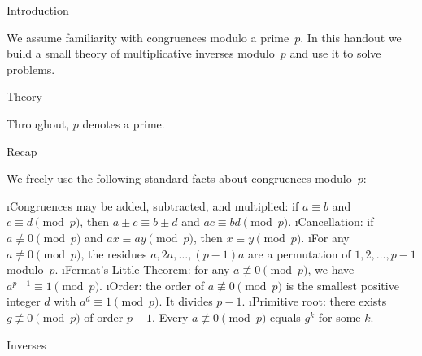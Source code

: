 





\sec Introduction

We assume familiarity with congruences modulo a prime~$p$. In this handout we build a small theory of multiplicative inverses modulo~$p$ and use it to solve problems.

\sec Theory

Throughout, $p$ denotes a prime.

\secc Recap

We freely use the following standard facts about congruences modulo~$p$:

\begitems
\i Congruences may be added, subtracted, and multiplied: if $a \equiv b$ and $c \equiv d \pmod{p}$, then $a \pm c \equiv b \pm d$ and $ac \equiv bd \pmod{p}$.
\i Cancellation: if $a \not\equiv 0 \pmod{p}$ and $ax \equiv ay \pmod{p}$, then $x \equiv y \pmod{p}$.
\i For any $a \not\equiv 0 \pmod{p}$, the residues $a, 2a, \ldots, (p-1)a$ are a permutation of $1, 2, \ldots, p-1$ modulo~$p$.
\i Fermat's Little Theorem: for any $a \not\equiv 0 \pmod{p}$, we have $a^{p-1} \equiv 1 \pmod{p}$.
\i Order: the order of $a \not\equiv 0 \pmod{p}$ is the smallest positive integer $d$ with $a^d \equiv 1 \pmod{p}$. It divides $p - 1$.
\i Primitive root: there exists $g \not\equiv 0 \pmod{p}$ of order $p - 1$. Every $a \not\equiv 0 \pmod{p}$ equals $g^k$ for some $k$.
\enditems

\secc Inverses


